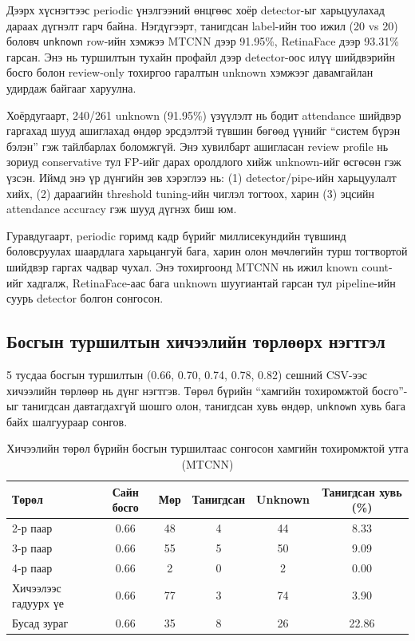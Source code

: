Дээрх хүснэгтээс periodic үнэлгээний өнцгөөс хоёр detector-ыг харьцуулахад дараах дүгнэлт гарч байна. Нэгдүгээрт, танигдсан label-ийн тоо ижил (20 vs 20) боловч \texttt{unknown} row-ийн хэмжээ MTCNN дээр 91.95\%, RetinaFace дээр 93.31\% гарсан. Энэ нь туршилтын тухайн профайл дээр detector-оос илүү шийдвэрийн босго болон review-only тохиргоо гаралтын unknown хэмжээг давамгайлан удирдаж байгааг харуулна.

Хоёрдугаарт, 240/261 unknown (91.95\%) үзүүлэлт нь бодит attendance шийдвэр гаргахад шууд ашиглахад өндөр эрсдэлтэй түвшин бөгөөд үүнийг ``систем бүрэн бэлэн'' гэж тайлбарлах боломжгүй. Энэ хувилбарт ашигласан review profile нь зориуд conservative тул FP-ийг дарах оролдлого хийж unknown-ийг өсгөсөн гэж үзсэн. Иймд энэ үр дүнгийн зөв хэрэглээ нь: (1) detector/pipe-ийн харьцуулалт хийх, (2) дараагийн threshold tuning-ийн чиглэл тогтоох, харин (3) эцсийн attendance accuracy гэж шууд дүгнэх биш юм.

Гуравдугаарт, periodic горимд кадр бүрийг миллисекундийн түвшинд боловсруулах шаардлага харьцангуй бага, харин олон мөчлөгийн турш тогтвортой шийдвэр гаргах чадвар чухал. Энэ тохиргоонд MTCNN нь ижил known count-ийг хадгалж, RetinaFace-аас бага unknown шуугиантай гарсан тул pipeline-ийн суурь detector болгон сонгосон.

\subsection{Босгын туршилтын хичээлийн төрлөөрх нэгтгэл}
5 тусдаа босгын туршилтын (0.66, 0.70, 0.74, 0.78, 0.82) сешний CSV-ээс хичээлийн төрлөөр нь дүнг нэгтгэв. Төрөл бүрийн ``хамгийн тохиромжтой босго''-ыг танигдсан давтагдахгүй шошго олон, танигдсан хувь өндөр, \texttt{unknown} хувь бага байх шалгуураар сонгов.

\begin{table}[H]
	\centering
	\caption{Хичээлийн төрөл бүрийн босгын туршилтаас сонгосон хамгийн тохиромжтой утга (MTCNN)}
	\label{tab:threshold-best-by-category-mtcnn}
	\begin{tabular}{|l|c|c|c|c|c|}
		\hline
		\textbf{Төрөл} & \textbf{Сайн босго} & \textbf{Мөр} & \textbf{Танигдсан} & \textbf{Unknown} & \textbf{Танигдсан хувь (\%)} \\
		\hline
		2-р паар & 0.66 & 48 & 4 & 44 & 8.33 \\
		\hline
		3-р паар & 0.66 & 55 & 5 & 50 & 9.09 \\
		\hline
		4-р паар & 0.66 & 2 & 0 & 2 & 0.00 \\
		\hline
		Хичээлээс гадуурх үе & 0.66 & 77 & 3 & 74 & 3.90 \\
		\hline
		Бусад зураг & 0.66 & 35 & 8 & 26 & 22.86 \\
		\hline
	\end{tabular}
\end{table}

